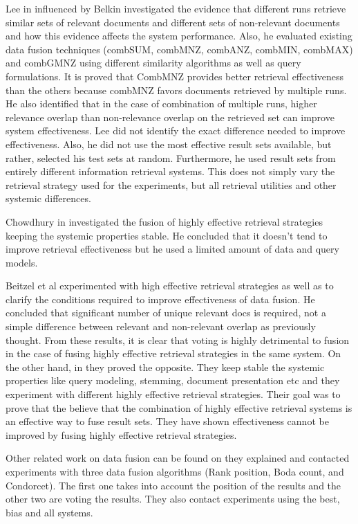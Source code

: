 Lee in \cite{Lee} influenced by Belkin investigated the evidence that different runs retrieve similar sets of relevant documents and different sets of non-relevant documents and how this evidence affects the system performance. Also, he evaluated existing data fusion techniques (combSUM, combMNZ, combANZ, combMIN, combMAX) and combGMNZ using different similarity algorithms as well as query formulations. It is proved that CombMNZ provides better retrieval effectiveness than the others because combMNZ favors documents retrieved by multiple runs. He also identified that in the case of combination of multiple runs, higher relevance overlap than non-relevance overlap on the retrieved set can improve system effectiveness. Lee did not identify the exact difference needed to improve effectiveness. Also, he did not use the most effective result sets available, but rather, selected his test sets at random. Furthermore, he used result sets from entirely different information retrieval systems. This does not simply vary the retrieval strategy used for the experiments, but all retrieval utilities and other systemic differences.

Chowdhury in \cite{Chowdhury} investigated the fusion of highly effective retrieval strategies keeping the systemic properties stable. He concluded that it doesn't tend to improve retrieval effectiveness but he used a limited amount of data and query models.

Beitzel et al \cite{Beitzel} experimented with high effective retrieval strategies as well as to clarify the conditions required to improve effectiveness of data fusion. He concluded that significant number of unique relevant docs is required, not a simple difference between relevant and non-relevant overlap as previously thought. From these results, it is clear that voting is highly detrimental to fusion in the case of fusing highly effective retrieval strategies in the same system. On the other hand, in \cite{Beitzel04} they proved the opposite. They keep stable the systemic properties like query modeling, stemming, document presentation etc and they experiment with different highly effective retrieval strategies. Their goal was to prove that the believe that the combination of highly effective retrieval systems is an effective way to fuse result sets. They have shown effectiveness cannot be improved by fusing highly effective retrieval strategies.

Other related work on data fusion can be found on \cite{NurayCan} they explained and contacted experiments with three data fusion algorithms (Rank position, Boda count, and Condorcet). The first one takes into account the position of the results and the other two are voting the results. They also contact experiments using the best, bias and all systems.

